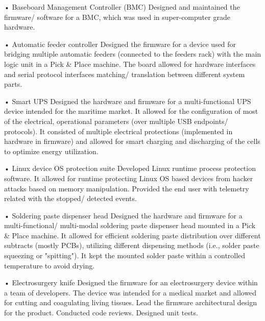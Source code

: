 \documentclass{tccv}
\begin{document}
\begin{yearlist}

\item[Firmware and software development]{•}
     {Baseboard Management Controller (BMC)}
     {Designed and maintained the firmware/ software for a BMC, which was used in super-computer grade hardware.}
     
\item[Firmware development]{•}
     {Automatic feeder controller}
     {Designed the firmware for a device used for bridging multiple automatic feeders (connected to the feeders rack) with the main logic unit in a Pick \& Place machine. The board allowed for hardware interfaces and serial protocol interfaces matching/ translation between different system parts.}
     
\item[Hardware and firmware development]{•}
     {Smart UPS}
     {Designed the hardware and firmware for a multi-functional UPS device intended for the maritime market. It allowed for the configuration of most of the electrical, operational parameters (over multiple USB endpoints/ protocols). It consisted of multiple electrical protections (implemented in hardware in firmware) and allowed for smart charging and discharging of the cells to optimize energy utilization.}
     
\item[Software development]{•}
     {Linux device OS protection suite}
     {Developed Linux runtime process protection software. It allowed for runtime protecting Linux OS based devices from hacker attacks based on memory manipulation. Provided the end user with telemetry related with the stopped/ detected events.}

\item[Hardware and firmware development]{•}
     {Soldering paste dispenser head}
     {Designed the hardware and firmware for a multi-functional/ multi-modal soldering paste dispenser head mounted in a Pick \& Place machine. It allowed for efficient soldering paste distribution over different subtracts (mostly PCBs), utilizing different dispensing methods (i.e., solder paste squeezing or "spitting"). It kept the mounted solder paste within a controlled temperature to avoid drying.}
     
\item[Firmware development]{•}
     {Electrosurgery knife}
     {Designed the firmware for an electrosurgery device within a team of developers. The device was intended for a medical market and allowed for cutting and coagulating living tissues. Lead the firmware architectural design for the product. Conducted code reviews. Designed unit tests.}     
     

\end{yearlist}
\end{document}

